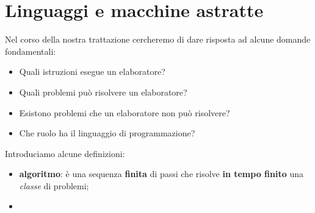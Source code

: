 


\chapter{Linguaggi e macchine astratte}

Nel corso della nostra trattazione cercheremo di dare risposta ad
alcune domande fondamentali:

\begin{itemize}
\item Quali istruzioni esegue un elaboratore?
\item Quali problemi pu\`o risolvere un elaboratore?
\item Esistono problemi che un elaboratore non pu\`o risolvere?
\item Che ruolo ha il linguaggio di programmazione?
\end{itemize}

Introduciamo alcune definizioni:

\begin{itemize}
\item \textbf{algoritmo}: \`e una sequenza \textbf{finita} di passi
  che risolve \textbf{in tempo finito} una \textit{classe} di
  problemi;

\item 

\end{itemize}


